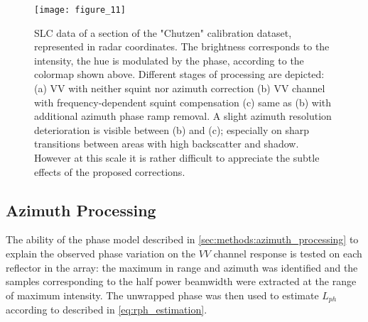 \begin{figure*}[ht]
	\centering
	\texttt{[image: figure\_11]}
	\caption{SLC data of a section of the "Chutzen" calibration dataset, represented in radar coordinates. The brightness corresponds to the intensity, the hue is modulated by the phase, according to the colormap shown above. Different stages of processing are depicted: (a) VV with neither squint nor azimuth correction (b) VV channel with frequency-dependent squint compensation (c) same as (b) with additional azimuth phase ramp removal. A slight azimuth resolution deterioration is visible between (b) and (c); especially on sharp transitions between areas with high backscatter and shadow. However at this scale it is rather difficult to appreciate the subtle effects of the proposed corrections.}
	\label{fig:scene_mph}
\end{figure*}


\subsection{Azimuth Processing}\label{sec:results:azimuth_processing}
The ability of the phase model described in \autoref{sec:methods:azimuth_processing} to explain the observed phase variation  on the $VV$ channel response is tested on each reflector in the array: the maximum in range and azimuth was identified and the samples corresponding to the half power beamwidth were extracted at the range of maximum intensity. The unwrapped phase was then used to estimate $L_{ph}$ according to described in \autoref{eq:rph_estimation}.

